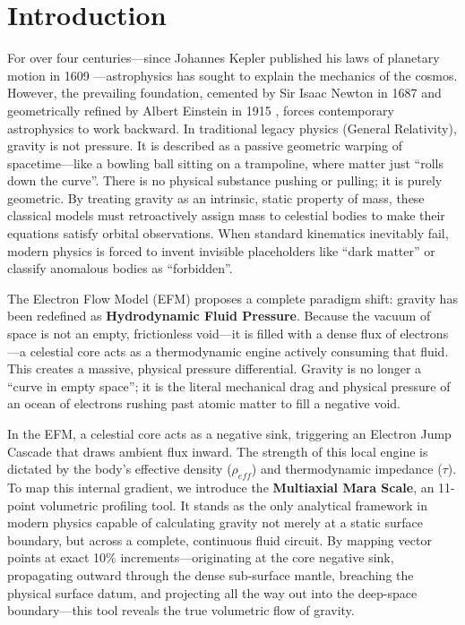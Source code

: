 \documentclass[11pt, a4paper]{article}
\begin{document}
\section{Introduction}
  For over four centuries---since Johannes Kepler published his laws of planetary motion in 1609 \cite{kepler1609}---astrophysics has sought to explain the mechanics of the cosmos. However, the prevailing foundation, cemented by Sir Isaac Newton in 1687 \cite{newton1687} and geometrically refined by Albert Einstein in 1915 \cite{einstein1915}, forces contemporary astrophysics to work backward. In traditional legacy physics (General Relativity), gravity is not pressure. It is described as a passive geometric warping of spacetime---like a bowling ball sitting on a trampoline, where matter just ``rolls down the curve''. There is no physical substance pushing or pulling; it is purely geometric. By treating gravity as an intrinsic, static property of mass, these classical models must retroactively assign mass to celestial bodies to make their equations satisfy orbital observations. When standard kinematics inevitably fail, modern physics is forced to invent invisible placeholders like ``dark matter'' or classify anomalous bodies as ``forbidden''.

  The Electron Flow Model (EFM) proposes a complete paradigm shift: gravity has been redefined as \textbf{Hydrodynamic Fluid Pressure}. Because the vacuum of space is not an empty, frictionless void---it is filled with a dense flux of electrons---a celestial core acts as a thermodynamic engine actively consuming that fluid. This creates a massive, physical pressure differential. Gravity is no longer a ``curve in empty space''; it is the literal mechanical drag and physical pressure of an ocean of electrons rushing past atomic matter to fill a negative void.

  In the EFM, a celestial core acts as a negative sink, triggering an Electron Jump Cascade that draws ambient flux inward. The strength of this local engine is dictated by the body's effective density ($\rho_{eff}$) and thermodynamic impedance ($\tau$). To map this internal gradient, we introduce the \textbf{Multiaxial Mara Scale}, an 11-point volumetric profiling tool. It stands as the only analytical framework in modern physics capable of calculating gravity not merely at a static surface boundary, but across a complete, continuous fluid circuit. By mapping vector points at exact 10\% increments---originating at the core negative sink, propagating outward through the dense sub-surface mantle, breaching the physical surface datum, and projecting all the way out into the deep-space boundary---this tool reveals the true volumetric flow of gravity.
\end{document}
